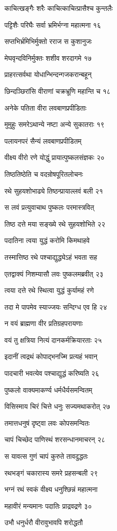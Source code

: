 काचित्खङ्गैः शरैः काचित्काचित्प्रासैश्च कुन्तलैः

पट्टिशैः परिघैः सर्वा भ्रमिर्भग्ना महात्मना १६

सप्तभिर्भ्रमिभिर्मुक्तो रराज स कुशानुजः

मेघवृन्दविनिर्मुक्तः शशीव शरदागमे १७

प्राहरत्सर्वथा योधान्भिन्दन्गजकरान्बहून्

छिन्दञ्छिरांसि वीराणां चक्रभ्रूणि महान्ति च १८

अनेके पतिता वीरा लवबाणप्रपीडिताः

मुमुहुः समरेऽथान्ये नष्टा अन्ये सुकातराः १९

पलायनपरं सैन्यं लवबाणप्रपीडितम्

वीक्ष्य वीरो रणे योद्धुं प्रायात्पुष्कलसंज्ञकः २०

तिष्ठतिष्ठेति च वदन्रोषपूरितलोचनः

रथे सुहयशोभाढ्ये तिष्ठन्प्रायाल्लवं बली २१

स लवं प्रत्युवाचाथ पुष्कलः परमास्त्रवित्

तिष्ठ दत्ते मया सङ्ख्ये रथे सुहयशोभिते २२

पदातिना त्वया युद्धं करोमि किमथाहवे

तस्मात्तिष्ठ रथे पश्चाद्युद्ध्येऽहं भवता सह

एतद्वाक्यं निशम्यासौ लवः पुष्कलमब्रवीत् २३

त्वया दत्ते रथे स्थित्वा युद्धं कुर्यामहं रणे

तदा मे पापमेव स्याज्जयः सन्दिग्ध एव हि २४

न वयं ब्राह्मणा वीर प्रतिग्रहपरायणाः

वयं तु क्षत्रिया नित्यं दानकर्मक्रियारताः २५

इदानीं त्वद्रथं कोपाद्भनज्मि प्रत्यहं भवान्

पादचारी भवत्येव पश्चाद्युद्धं करिष्यति २६

पुष्कलो वाक्यमाकर्ण्य धर्मधैर्यसमन्वितम्

विसिस्माय चिरं चित्ते धनुः सज्यमथाकरोत् २७

तमात्तधनुषं दृष्ट्वा लवः कोपसमन्वितः

चापं चिच्छेद पाणिस्थं शरसन्धानमाचरन् २८

स यावत्स गुणं चापं कुरुते तावदुद्धतः

रथभङ्गं चकारास्य समरे प्रहसन्बली २९

भग्नं रथं स्वकं वीक्ष्य धनुश्छिन्नं महात्मना

महावीरं मन्यमानः पदातिः प्राद्रवद्रणे ३०

उभौ धनुर्धरौ वीरावुभावपि शरोद्धतौ

